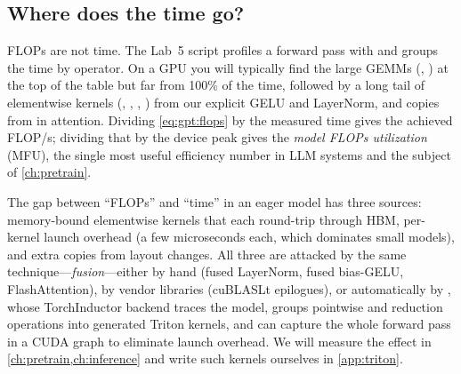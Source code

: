\subsection{Where does the time go?}
FLOPs are not time. The Lab~5  script profiles a forward pass with
 and groups the time by operator. On a GPU you will typically find the large
GEMMs (, ) at the top of the table but far from 100\% of the time,
followed by a long tail of elementwise kernels (, ,
, ) from our explicit GELU and LayerNorm, and copies from
 in attention. Dividing \cref{eq:gpt:flops} by the measured time gives
the achieved FLOP/s; dividing that by the device peak gives the \emph{model FLOPs utilization}
(MFU), the single most useful efficiency number in LLM systems and the subject of
\cref{ch:pretrain}.

\begin{systemslens}
The gap between ``FLOPs'' and ``time'' in an eager model has three sources: memory-bound
elementwise kernels that each round-trip through HBM, per-kernel launch overhead (a few microseconds
each, which dominates small models), and extra copies from layout changes. All three are attacked by
the same technique---\emph{fusion}---either by hand (fused LayerNorm, fused bias-GELU,
FlashAttention), by vendor libraries (cuBLASLt epilogues), or automatically by
, whose TorchInductor backend traces the model, groups pointwise and reduction
operations into generated Triton kernels, and can capture the whole forward pass in a CUDA graph to
eliminate launch overhead. We will measure the effect in \cref{ch:pretrain,ch:inference} and write
such kernels ourselves in \cref{app:triton}.
\end{systemslens}

